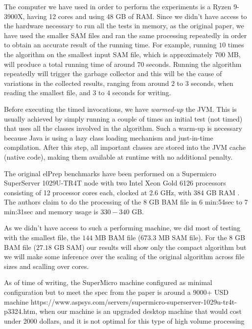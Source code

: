 \documentclass[a4paper,twoside]{article}
\begin{document}
The computer we have used in order to perform the experiments is a Ryzen 9-3900X, having 12 cores and using 48 GB of RAM.
Since we didn't have access to the hardware necessary to run all the tests in memory, as the original paper, we have used the smaller SAM files and ran the same processing repeatedly in order to obtain an accurate result of the running time.
For example, running $10$ times the algorithm on the smallest input SAM file, which is approximately $700$ MB, will produce a total running time of around $70$ seconds. 
Running the algorithm repeatedly will trigger the garbage collector and this will be the cause of variations in the collected results, ranging from around $2$ to $3$ seconds, when reading the smallest file, and $3$ to $4$ seconds for writing.

Before executing the timed invocations, we have {\it warmed-up} the JVM. 
This is usually achieved by simply running a couple of times an initial test (not timed) that uses all the classes involved in the algorithm. Such a warm-up is necessary because Java is using a lazy class loading mechanism and just-in-time compilation. After this step, all important classes are stored into the JVM cache (native code), making them available at runtime with no additional penalty.

The original elPrep benchmarks have been performed on a Supermicro SuperServer 1029U-TR4T node with two
Intel Xeon Gold 6126 processors consisting of 12 processor cores each, clocked at 2.6 GHz, with 384 GB
RAM \cite{costanza:2019}. The authors claim to do the processing of the 8 GB BAM file in 6 min:54sec to 7 min:31sec and memory usage is $330-340$ GB.

As we didn't have access to such a performing machine, we did most of testing with the smallest file, the $144$ MB BAM file ($673.3$ MB SAM file). For the $8$ GB BAM file ($27.18$ GB SAM) our results will show only the compact algorithm but we will make some inference over the scaling of the original algorithm across file sizes and scalling over cores.

As of time of writing, the SuperMicro machine configured as minimal configuration but to meet the spec from the paper is around a 9000+ USD machine https://www.aspsys.com/servers/supermicro-superserver-1029u-tr4t-p3324.htm, when our machine is an upgraded desktop machine that would cost under 2000 dollars, and it is not optimal for this type of high volume processing
\end{document}

